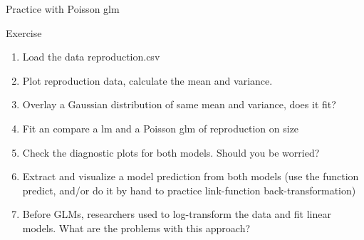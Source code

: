 \documentclass[10pt]{beamer}
\begin{document}
\begin{frame}{Practice with Poisson glm}
 
  \begin{exampleblock}{Exercise}
    \begin{enumerate}
      \item Load the data reproduction.csv
      \item Plot reproduction data, calculate the mean and variance. 
      \item Overlay a Gaussian distribution of same mean and variance, does it fit?
      \item Fit an compare a lm and a Poisson glm of reproduction on size 
      \item Check the diagnostic plots for both models. Should you be worried?
      \item Extract and visualize a model prediction from both models (use the function predict, and/or do it by hand to practice link-function back-transformation)
      \item Before GLMs, researchers used to log-transform the data and fit linear models. What are the problems with this approach?
    \end{enumerate}
  \end{exampleblock}
\end{frame}
\end{document}
